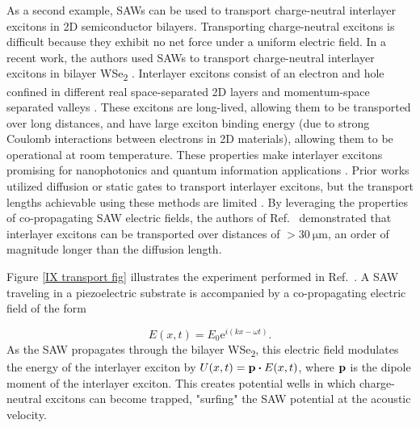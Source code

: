 \documentclass{beavtex_dub_edit}
\begin{document}
As a second example, SAWs can be used to transport charge-neutral interlayer excitons in 2D semiconductor bilayers. Transporting charge-neutral excitons is difficult because they exhibit no net force under a uniform electric field. In a recent work, the authors used SAWs to transport charge-neutral interlayer excitons in bilayer WSe\textsubscript{2} \cite{peng_long-range_2022}. Interlayer excitons consist of an electron and hole confined in different real space-separated 2D layers and momentum-space separated valleys \cite{rivera_interlayer_2018}. These excitons are long-lived, allowing them to be transported over long distances, and have large exciton binding energy (due to strong Coulomb interactions between electrons in 2D materials), allowing them to be operational at room temperature. These properties make interlayer excitons promising for nanophotonics and quantum information applications \cite{kuznetsova_all-optical_2010, tran_evidence_2019, liu_electrically_2020}. Prior works utilized diffusion or static gates to transport interlayer excitons, but the transport lengths achievable using these methods are limited \cite{jauregui_electrical_2019,unuchek_room-temperature_2018, liu_electrically_2020}. By leveraging the properties of co-propagating SAW electric fields, the authors of Ref.\ \cite{peng_long-range_2022} demonstrated that interlayer excitons can be transported over distances of $> \SI{30}{\micro\meter}$, an order of magnitude longer than the diffusion length. 

Figure \ref{IX transport fig} illustrates the experiment performed in Ref.\ \cite{peng_long-range_2022}. A SAW traveling in a piezoelectric substrate is accompanied by a co-propagating electric field of the form

\begin{equation}
    E(x, t) = E_0 \mathrm{e}^{i(kx - \omega t)}. 
\end{equation}
As the SAW propagates through the bilayer WSe\textsubscript{2}, this electric field modulates the energy of the interlayer exciton by $U(x,t) = \vectorbold{p} \dotproduct E(x,t)$, where $\vectorbold{p}$ is the dipole moment of the interlayer exciton. This creates potential wells in which charge-neutral excitons can become trapped, "surfing" the SAW potential at the acoustic velocity.
\end{document}
